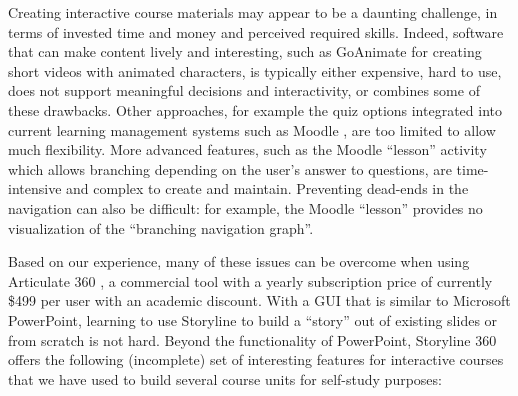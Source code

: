\documentclass[sigconf,anonymous]{acmart}
\begin{document}
Creating interactive course materials may appear to be a daunting challenge, in terms of invested
time and money and perceived required skills. Indeed, software that can
make content lively and interesting, such as GoAnimate \cite{GoAnimate} for creating
short videos with animated characters, is typically either expensive, hard to use, does
not support meaningful decisions and interactivity, or
combines some of these drawbacks. Other approaches, for example the quiz options integrated into current
learning management systems such as Moodle \cite{Moodle}, are too limited to allow much
flexibility. More advanced
features, such as the Moodle ``lesson'' activity which allows branching depending on the user's answer
to questions, are time-intensive and complex to create and maintain. Preventing dead-ends in 
the navigation can also be difficult: for example, the Moodle ``lesson'' provides no visualization of
the ``branching navigation graph''.

Based on our experience, many of these issues can be overcome when using Articulate 360
\cite{Storyline}, a commercial tool with a yearly subscription price of currently \$499 per user
with an academic discount. With a GUI that is similar to Microsoft PowerPoint, learning to use
Storyline to build a ``story'' out of existing slides or from scratch is not hard. Beyond the functionality
of PowerPoint, Storyline 360 offers the following (incomplete) set of interesting features for
interactive courses that we have used to build several course units for self-study purposes:
\end{document}
